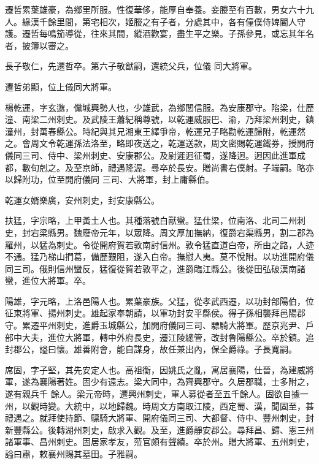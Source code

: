\begin{pinyinscope}
 遷哲累葉雄豪，為鄉里所服。性復華侈，能厚自奉養。妾媵至有百數，男女六十九人。緣漢千餘里間，第宅相次，姬媵之有子者，分處其中，各有僮僕侍婢閽人守護。遷哲每鳴笳導從，往來其間，縱酒歡宴，盡生平之樂。子孫參見，或忘其年名者，披簿以審之。



 長子敬仁，先遷哲卒。第六子敬猷嗣，還統父兵，位儀
 同大將軍。



 遷哲弟顯，位上儀同大將軍。



 楊乾運，字玄邈，儻城興勢人也，少雄武，為鄉閭信服。為安康郡守。陷梁，仕歷潼、南梁二州刺史。及武陵王蕭紀稱尊號，以乾運威服巴、渝，乃拜梁州刺史，鎮潼州，封萬春縣公。時紀與其兄湘東王繹爭帝，乾運兄子略勸乾運歸附，乾運然之。會周文令乾運孫法洛至，略即夜送之，乾運送款，周文密賜乾運鐵券，授開府儀同三司、侍中、梁州刺史、安康郡公。及尉遲迥征蜀，遂降迥。迥因此進軍成都，數旬剋之。及至京師，禮遇隆渥。尋卒於長安。贈尚書右僕射。子端嗣。略亦以歸附功，位至開府儀同
 三司、大將軍，封上庸縣伯。



 乾運女婿樂廣，安州刺史，封安康縣公。



 扶猛，字宗略，上甲黃土人也。其種落號白獸蠻。猛仕梁，位南洛、北司二州刺史，封宕梁縣男。魏廢帝元年，以眾降。周文厚加撫納，復爵宕渠縣男，割二郡為羅州，以猛為刺史。令從開府賀若敦南討信州。敦令猛直道白帝，所由之路，人迹不通。猛乃梯山捫葛，備歷艱阻，遂入白帝。撫慰人夷。莫不悅附。以功進開府儀同三司。俄則信州蠻反，猛復從賀若敦平之，進爵臨江縣公。後從田弘破漢南諸蠻，進位大將軍。卒。



 陽雄，字元略，上洛邑陽人也。累葉豪族。父猛，從孝武西遷，以功封郃陽伯，位征東將軍、揚州刺史。雄起家奉朝請，以軍功封安平縣侯。得子孫相襲拜邑陽郡守。累遷平州刺史，進爵玉城縣公，加開府儀同三司、驃騎大將軍。歷京兆尹、戶部中大夫，進位大將軍，轉中外府長史，遷江陵總管，改封魯陽縣公。卒於鎮。追封郡公，謚曰懷。雄善附會，能自謀身，故任兼出內，保全爵祿。子長寬嗣。



 席固，字子堅，其先安定人也。高祖衡，因姚氏之亂，寓居襄陽，仕晉，為建威將軍，遂為襄陽著姓。固少有遠志。梁大同中，為齊興郡守。久居郡職，士多附之，遂有親兵千
 餘人。梁元帝時，遷興州刺史，軍人募從者至五千餘人。固欲自據一州，以觀時變。大統中，以地歸魏。時周文方南取江陵，西定蜀、漢，聞固至，甚禮遇之。就拜使持節、驃騎大將軍、開府儀同三司、大都督、侍中、豐州刺史，封新豐縣公。後轉湖州刺史，啟求入觀。及至，進爵靜安郡公。尋拜昌、歸、憲三州諸軍事、昌州刺史。固居家孝友，蒞官頗有聲績。卒於州。贈大將軍、五州刺史，謚曰肅，敕襄州賜其墓田。子雅嗣。




\end{pinyinscope}
